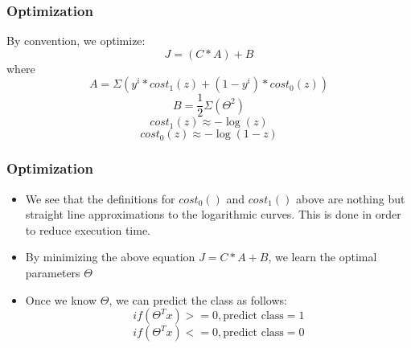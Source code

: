 \documentclass[11pt,xcolor=dvipsnames]{beamer}
\begin{document}
\begin{frame}
\frametitle{Optimization}
By convention, we optimize:\\
\begin{displaymath}J = (C * A) + B\end{displaymath}
\medskip
where\\
\medskip        
\begin{displaymath}A = \Sigma(y^i * cost_{1}(z)  +  (1-y^i) * cost_{0}(z))\end{displaymath}    
\begin{displaymath}B = \frac{1}{2} \Sigma(\Theta^2)\end{displaymath}
\begin{displaymath}cost_{1}(z) \approx -\log(z)\end{displaymath}
\begin{displaymath}cost_{0}(z) \approx -\log(1 - z)\end{displaymath}
\end{frame}


\begin{frame}
\frametitle{Optimization}
\begin{itemize}
\item We see that the definitions for $cost_0()$ and $cost_1()$ above are nothing but straight line approximations to the logarithmic curves. This is done in order to reduce execution time.\\
\item By minimizing the above equation $J = C*A + B$, we learn the optimal parameters $\Theta$\\
\item Once we know $\Theta$, we can predict the class as follows: \\
\begin{displaymath}if(\Theta^Tx) >= 0, \text{predict class} = 1\end{displaymath}
\begin{displaymath}if(\Theta^Tx) <= 0, \text{predict class} = 0\end{displaymath}
\end{itemize}
\end{frame}
\end{document}
